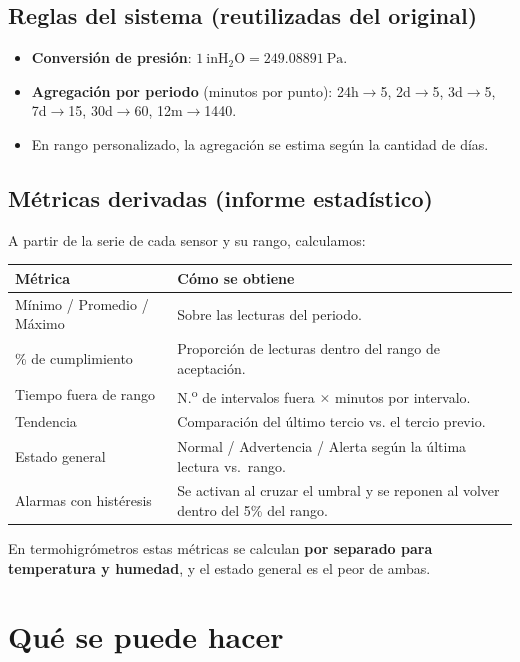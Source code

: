\documentclass[11pt,a4paper]{article}
\begin{document}
\subsection{Reglas del sistema (reutilizadas del original)}
\begin{itemize}[leftmargin=1.4em]
  \item \textbf{Conversión de presión}: $1\ \text{inH}_2\text{O} = 249.08891\ \text{Pa}$.
  \item \textbf{Agregación por periodo} (minutos por punto):
        24h$\to$5, 2d$\to$5, 3d$\to$5, 7d$\to$15, 30d$\to$60, 12m$\to$1440.
  \item En rango personalizado, la agregación se estima según la cantidad de días.
\end{itemize}

\subsection{Métricas derivadas (informe estadístico)}
A partir de la serie de cada sensor y su rango, calculamos:
\begin{center}
\begin{tabular}{@{}p{4.8cm}p{9.6cm}@{}}
\toprule
\textbf{Métrica} & \textbf{Cómo se obtiene} \\
\midrule
Mínimo / Promedio / Máximo & Sobre las lecturas del periodo. \\
\% de cumplimiento & Proporción de lecturas dentro del rango de aceptación. \\
Tiempo fuera de rango & N.\textsuperscript{o} de intervalos fuera $\times$ minutos por intervalo. \\
Tendencia & Comparación del último tercio vs. el tercio previo. \\
Estado general & Normal / Advertencia / Alerta según la última lectura vs.\ rango. \\
Alarmas con histéresis & Se activan al cruzar el umbral y se reponen al volver dentro del 5\% del rango. \\
\bottomrule
\end{tabular}
\end{center}

\noindent En termohigrómetros estas métricas se calculan \textbf{por separado para temperatura
y humedad}, y el estado general es el peor de ambas.

\section{Qué se puede hacer}
\end{document}
